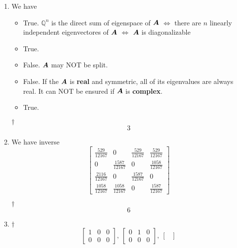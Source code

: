 \documentclass[a4paper,12pt]{article}
\begin{document}
\begin{enumerate}
    \item We have \begin{itemize}
        \item True. $\mathbb{Q}^n$ is the direct sum of eigenspace of $\boldsymbol{A}$ $\iff$ there are $n$ linearly independent eigenvectores of $\boldsymbol{A}$ $\iff$ $\boldsymbol{A}$ is diagonalizable
        \item True.
        \item False. $\boldsymbol{A}$ may NOT be split.
        \item False. If the $\boldsymbol{A}$ is \textbf{real} and symmetric, all of its eigenvalues are always real. It can NOT be ensured if $\boldsymbol{A}$ is \textbf{complex}.
        \item True. 
    \end{itemize}
    \begin{answer}{$\dag$}\begin{equation}
            3   
        \end{equation}
    \end{answer}
    \item We have inverse \begin{equation}
        \begin{bmatrix}
            \frac{529}{12167} & 0 & \frac{529}{12167} & \frac{529}{12167} \\
            0 & \frac{1587}{12167} & 0 & \frac{1058}{12167} \\
            \frac{2116}{12167} & 0 & \frac{1587}{12167} & 0 \\
            \frac{1058}{12167} & \frac{1058}{12167} & 0 & \frac{1587}{12167}
        \end{bmatrix}
    \end{equation}
    \begin{answer}{$\dag$}\begin{equation}
            6
        \end{equation}
    \end{answer}
    \item \begin{answer}{$\dag$}\begin{equation}
            \begin{bmatrix}
                1 & 0 & 0 \\
                0 & 0 & 0
            \end{bmatrix}, \ \begin{bmatrix}
                0 & 1 & 0 \\
                0 & 0 & 0
            \end{bmatrix}, \ \begin{bmatrix}

\end{bmatrix}
\end{equation}
\end{answer}
\end{enumerate}
\end{document}
